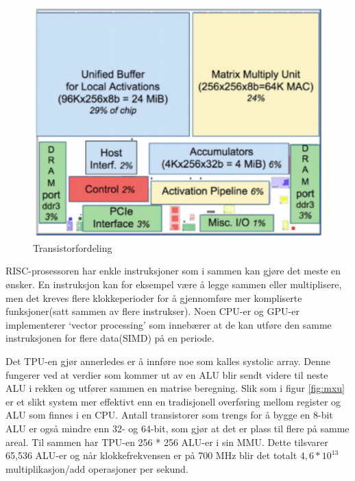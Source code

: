 \begin{figure}[ht]
    \centering
    \includegraphics[width=\textwidth]{images/tpu_transistor_fordeling.jpg}
    \caption{Transistorfordeling}
    \label{fig:transistor}
\end{figure}
 
RISC-prosessoren har enkle instruksjoner som i sammen kan gjøre det meste en ønsker. En instruksjon kan for eksempel være å legge sammen eller multiplisere, men det kreves flere klokkeperioder for å gjennomføre mer kompliserte funksjoner(satt sammen av flere instrukser). Noen CPU-er og GPU-er implementerer ‘vector processing’ \cite{look_at_TPU} som innebærer at de kan utføre den samme instruksjonen for flere data(SIMD) på en periode. 

Det TPU-en gjør annerledes er å innføre noe som kalles systolic array. Denne fungerer ved at verdier som kommer ut av en ALU blir sendt videre til neste ALU i rekken og utfører sammen en matrise beregning. Slik som i figur \ref{fig:mxu} er et slikt system mer effektivt enn en tradisjonell overføring mellom register og ALU som finnes i en CPU. Antall transistorer som trengs for å bygge en 8-bit ALU er også mindre enn 32- og 64-bit, som gjør at det er plass til flere på samme areal. Til sammen har TPU-en 256 * 256 ALU-er i sin MMU\cite{look_at_TPU}. Dette tilsvarer 65,536 ALU-er og når klokkefrekvensen er på 700 MHz blir det totalt $4,6 * 10^{13}$ multiplikasjon/add operasjoner per sekund. 

